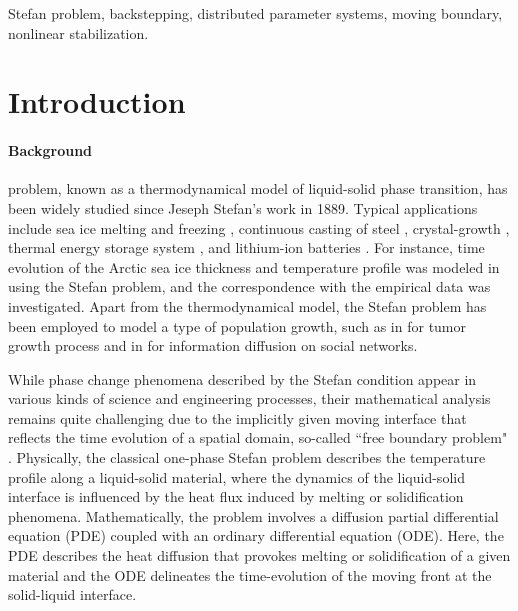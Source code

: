 \documentclass[journal]{IEEEtran}
\begin{document}
\begin{IEEEkeywords}
Stefan problem, backstepping, distributed parameter systems, moving  boundary, nonlinear stabilization.
\end{IEEEkeywords}

\IEEEpeerreviewmaketitle

\section{Introduction}
\paragraph{Background}
\hspace{10mm}
 problem,  known as a thermodynamical model of liquid-solid phase transition, has been widely studied since Jeseph Stefan's work in 1889\cite{stefan91}. Typical applications include sea ice melting and freezing \cite{wettlaufer91, maykut71}, continuous casting of steel \cite{petrus12}, crystal-growth \cite{conrad_90},  thermal energy storage system \cite{zalba03}, and lithium-ion batteries \cite{srinivasan04}. For instance, time evolution of the Arctic sea ice thickness and temperature profile was modeled in \cite{maykut71} using the Stefan problem, and the correspondence with the empirical data was investigated. Apart from the thermodynamical model, the Stefan problem has been employed to model a type of population growth, such as in \cite{Friedman1999} for tumor growth process and in \cite{Lei2013} for information diffusion on social networks. 

While phase change phenomena described by the  Stefan condition appear in various kinds of science and engineering processes, their mathematical analysis remains quite challenging due to the implicitly given moving interface that reflects the time evolution of a spatial domain, so-called ``free boundary problem" \cite{Gupta03}. Physically, the classical one-phase Stefan problem describes the temperature profile along a liquid-solid material, where the dynamics of the liquid-solid interface is influenced by the heat flux induced by melting or solidification phenomena. Mathematically, the problem  involves a diffusion partial differential equation (PDE) coupled with an ordinary differential equation (ODE). Here, the PDE describes the heat diffusion that provokes melting or solidification of a given material and the ODE  delineates the time-evolution  of the moving front at the solid-liquid interface.
\end{document}
